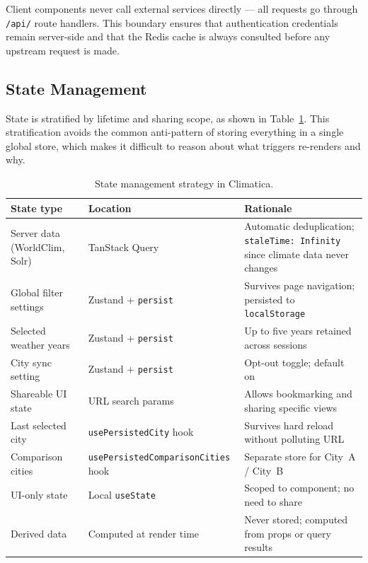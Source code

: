 Client components never call external services directly --- all requests go
through \texttt{/api/} route handlers. This boundary ensures that
authentication credentials remain server-side and that the Redis cache is
always consulted before any upstream request is made.

\subsection{State Management}\label{APP_ARCH_STATE}

State is stratified by lifetime and sharing scope, as shown in
Table~\ref{tab:state}. This stratification avoids the common anti-pattern of
storing everything in a single global store, which makes it difficult to reason
about what triggers re-renders and why.

\begin{table}
  \centering
  \caption{State management strategy in Climatica.}
  \label{tab:state}
  \small
  \begin{tabular}{p{4cm}p{3.5cm}p{10cm}}
    \toprule
    \textbf{State type} & \textbf{Location} & \textbf{Rationale} \\
    \midrule
    Server data (WorldClim, Solr) & TanStack Query &
      Automatic deduplication; \texttt{staleTime: Infinity} since climate
      data never changes \\
    
    Global filter settings & Zustand + \texttt{persist} &
      Survives page navigation; persisted to \texttt{localStorage} \\

    Selected weather years & Zustand + \texttt{persist} &
      Up to five years retained across sessions \\

    City sync setting & Zustand + \texttt{persist} &
      Opt-out toggle; default on \\

    Shareable UI state & URL search params &
      Allows bookmarking and sharing specific views \\

    Last selected city & \texttt{usePersistedCity} hook &
      Survives hard reload without polluting URL \\

    Comparison cities & \texttt{usePersistedComparisonCities} hook &
      Separate store for City~A / City~B \\

    UI-only state & Local \texttt{useState} &
      Scoped to component; no need to share \\
      
    Derived data & Computed at render time &
      Never stored; computed from props or query results \\
    \bottomrule
  \end{tabular}
\end{table}

